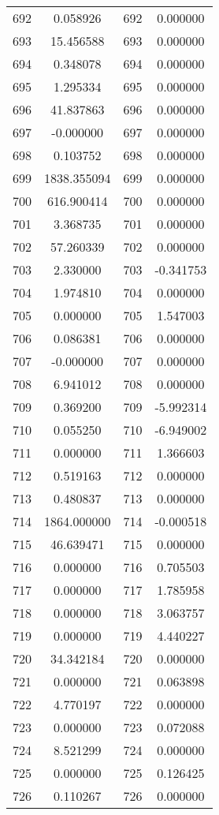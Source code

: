 \documentclass[12pt]{article}
\begin{document}
\begin{longtable}{@{}cccc@{}}
692 & 0.058926 & 692 & 0.000000 \\
693 & 15.456588 & 693 & 0.000000 \\
694 & 0.348078 & 694 & 0.000000 \\
695 & 1.295334 & 695 & 0.000000 \\
696 & 41.837863 & 696 & 0.000000 \\
697 & -0.000000 & 697 & 0.000000 \\
698 & 0.103752 & 698 & 0.000000 \\
699 & 1838.355094 & 699 & 0.000000 \\
700 & 616.900414 & 700 & 0.000000 \\
701 & 3.368735 & 701 & 0.000000 \\
702 & 57.260339 & 702 & 0.000000 \\
703 & 2.330000 & 703 & -0.341753 \\
704 & 1.974810 & 704 & 0.000000 \\
705 & 0.000000 & 705 & 1.547003 \\
706 & 0.086381 & 706 & 0.000000 \\
707 & -0.000000 & 707 & 0.000000 \\
708 & 6.941012 & 708 & 0.000000 \\
709 & 0.369200 & 709 & -5.992314 \\
710 & 0.055250 & 710 & -6.949002 \\
711 & 0.000000 & 711 & 1.366603 \\
712 & 0.519163 & 712 & 0.000000 \\
713 & 0.480837 & 713 & 0.000000 \\
714 & 1864.000000 & 714 & -0.000518 \\
715 & 46.639471 & 715 & 0.000000 \\
716 & 0.000000 & 716 & 0.705503 \\
717 & 0.000000 & 717 & 1.785958 \\
718 & 0.000000 & 718 & 3.063757 \\
719 & 0.000000 & 719 & 4.440227 \\
720 & 34.342184 & 720 & 0.000000 \\
721 & 0.000000 & 721 & 0.063898 \\
722 & 4.770197 & 722 & 0.000000 \\
723 & 0.000000 & 723 & 0.072088 \\
724 & 8.521299 & 724 & 0.000000 \\
725 & 0.000000 & 725 & 0.126425 \\
726 & 0.110267 & 726 & 0.000000 \\

\end{longtable}
\end{document}
